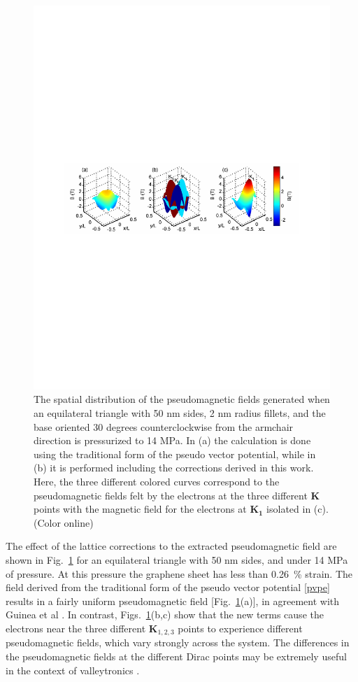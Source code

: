 \begin{figure}
\includegraphics{Figs_PVP/figure_3.pdf}
\caption{\label{triholes}The spatial distribution of the pseudomagnetic fields generated when an equilateral triangle with 50 nm sides, 2 nm radius fillets, and the base oriented 30 degrees counterclockwise from the armchair direction is pressurized to 14 MPa. In (a) the calculation is done using the traditional form of the pseudo vector potential, while in (b) it is performed including the corrections derived in this work. Here, the three different colored curves correspond to the pseudomagnetic fields felt by the electrons at the three different $\bm{K}$ points with the magnetic field for the electrons at $\bm{K_1}$ isolated in (c). (Color online)}
\end{figure}

The effect of the lattice corrections to the extracted pseudomagnetic field are shown in Fig.~\ref{triholes} for an equilateral triangle with 50 nm sides, and under 14 MPa of pressure.
At this pressure the graphene sheet has less than 0.26~\% strain.
The field derived from the traditional form of the pseudo vector potential \eqref{pvpe} results in a fairly uniform pseudomagnetic field [Fig.~\ref{triholes}(a)], in agreement with Guinea et al \cite{Guinea2009}.
In contrast, Figs.~\ref{triholes}(b,c) show that the new terms cause the electrons near the three different $\bm{K}_{1,2,3}$ points to experience different pseudomagnetic fields, which vary strongly across the system.
The differences in the pseudomagnetic fields at the different Dirac points may be extremely useful in the context of valleytronics \cite{Rycerz2007}.

